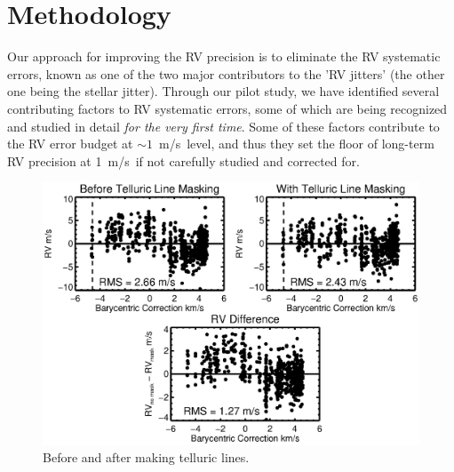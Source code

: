 \documentclass[12pt]{article}
\def\mps{m/s}
\begin{document}



\vspace{-3pt}
\section{Methodology}

Our approach for improving the RV precision is to eliminate the RV
systematic errors, known as one of the two major contributors to the
'RV jitters' (the other one being the stellar jitter). Through our
pilot study, we have identified several contributing factors to RV
systematic errors, some of which are being recognized and studied in
detail \textit{for the very first time}. Some of these factors
contribute to the RV error budget at $\sim 1$~\mps\ level, and thus
they set the floor of long-term RV precision at 1~\mps\ if not
carefully studied and corrected for.

\begin{figure}[thb]
  \vspace{-5pt}
  \begin{center}
    \includegraphics[scale=0.7]{telluric}
  \end{center}
  \vspace{-25pt}  
  \caption{Before and after making telluric lines.}
  \vspace{-8pt}  
  \label{fig:tell}
\end{figure}


\vspace{-3pt}
\end{document}
